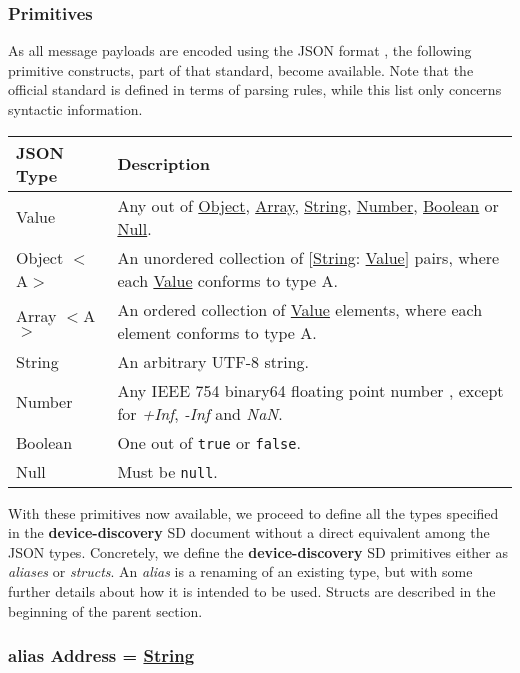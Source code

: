 \documentclass[a4paper]{arrowhead}
\newcommand{\pdef}[1]{{\textcolor{ArrowheadGrey}{#1 \label{sec:model:primitives:#1} \label{sec:model:primitives:#1s}}}}
\newcommand{\pref}[1]{{\textcolor{ArrowheadGrey}{\hyperref[sec:model:primitives:#1]{#1}}}}
\begin{document}
\subsubsection{Primitives}
\label{sec:model:primitives}

As all message payloads are encoded using the JSON format \cite{bray2014json}, the following primitive constructs, part of that standard, become available.
Note that the official standard is defined in terms of parsing rules, while this list only concerns syntactic information. 

\begin{table}[ht!]
\begin{tabularx}{\textwidth}{| p{3cm} | X |} \hline
\rowcolor{gray!33} JSON Type & Description \\ \hline
\pdef{Value}                 & Any out of \pref{Object}, \pref{Array}, \pref{String}, \pref{Number}, \pref{Boolean} or \pref{Null}. \\ \hline
\pdef{Object}$<$A$>$         & An unordered collection of $[$\pref{String}: \pref{Value}$]$ pairs, where each \pref{Value} conforms to type A. \\ \hline
\pdef{Array}$<$A$>$          & An ordered collection of \pref{Value} elements, where each element conforms to type A. \\ \hline
\pdef{String}                & An arbitrary UTF-8 string. \\ \hline
\pdef{Number}                & Any IEEE 754 binary64 floating point number \cite{cowlishaw2019floating}, except for \textit{+Inf}, \textit{-Inf} and \textit{NaN}. \\ \hline
\pdef{Boolean}               & One out of \texttt{true} or \texttt{false}. \\ \hline
\pdef{Null}                  & Must be \texttt{null}. \\ \hline
\end{tabularx}
\end{table}

With these primitives now available, we proceed to define all the types specified in the \textbf{device-discovery} SD document without a direct equivalent among the JSON types.
Concretely, we define the \textbf{device-discovery} SD primitives either as \textit{aliases} or \textit{structs}.
An \textit{alias} is a renaming of an existing type, but with some further details about how it is intended to be used.
Structs are described in the beginning of the parent section.

\subsubsection{alias \pdef{Address} = \pref{String}}
\end{document}
